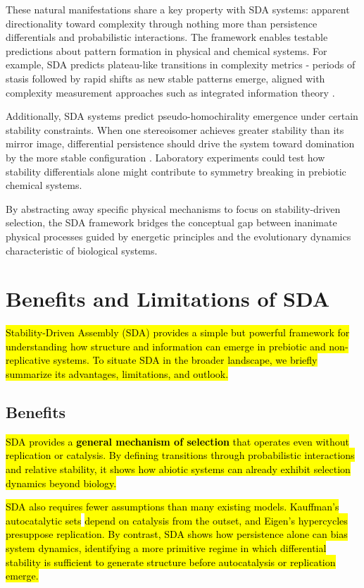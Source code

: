 \documentclass[preprint,12pt]{elsarticle}
\newcommand{\added}[1]{\hl{#1}}
\begin{document}
These natural manifestations share a key property with SDA systems: apparent directionality toward complexity through nothing more than persistence differentials and probabilistic interactions. The framework enables testable predictions about pattern formation in physical and chemical systems. For example, SDA predicts plateau-like transitions in complexity metrics - periods of stasis followed by rapid shifts as new stable patterns emerge, aligned with complexity measurement approaches such as integrated information theory \cite{tononi2008phi}.

Additionally, SDA systems predict pseudo-homochirality emergence under certain stability constraints. When one stereoisomer achieves greater stability than its mirror image, differential persistence should drive the system toward domination by the more stable configuration \cite{blackmond2010chiral}. Laboratory experiments could test how stability differentials alone might contribute to symmetry breaking in prebiotic chemical systems.

By abstracting away specific physical mechanisms to focus on stability-driven selection, the SDA framework bridges the conceptual gap between inanimate physical processes guided by energetic principles and the evolutionary dynamics characteristic of biological systems.

\section{Benefits and Limitations of SDA}
\label{sec:benefits-limitations}

\added{
Stability-Driven Assembly (SDA) provides a simple but powerful framework for
understanding how structure and information can emerge in prebiotic and
non-replicative systems. To situate SDA in the broader landscape, we briefly
summarize its advantages, limitations, and outlook.
}

\subsection*{Benefits}

\added{
SDA provides a \textbf{general mechanism of selection} that operates even
without replication or catalysis. By defining transitions through probabilistic
interactions and relative stability, it shows how abiotic systems can already
exhibit selection dynamics beyond biology.
}

\added{SDA also requires fewer assumptions than many existing models. 
Kauffman’s autocatalytic sets} \cite{kauffman1986autocatalytic,hordijk2012autocatalytic,nghe2015prebiotic} 
\added{depend on catalysis from the outset, and Eigen’s hypercycles} 
\cite{wu2012origin,nowak2006evolutionary} 
\added{presuppose replication. By contrast, SDA shows how persistence alone can bias 
system dynamics, identifying a more primitive regime in which differential 
stability is sufficient to generate structure before autocatalysis or replication emerge.}
\end{document}
